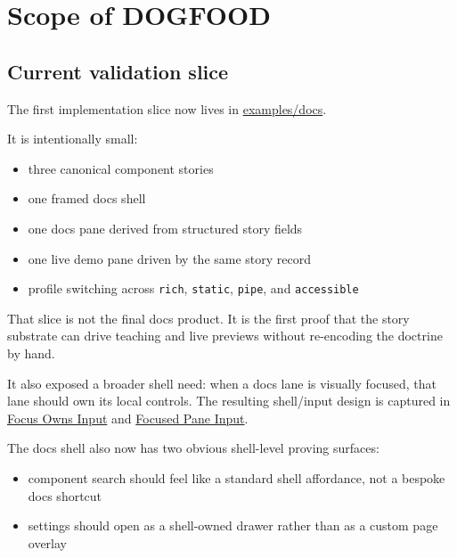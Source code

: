 \section{Scope of DOGFOOD}\label{record-042-scope-of-dogfood}

\subsection{Current validation slice}\label{record-042-current-validation-slice}

The first implementation slice now lives in \href{https://github.com/flyingrobots/bijou/blob/cbd70612140e7a450d764b3c7be1c6af878b99bc/examples/docs/README.md}{examples/docs}.

It is intentionally small:

\begin{itemize}
\tightlist
\item
  three canonical component stories
\item
  one framed docs shell
\item
  one docs pane derived from structured story fields
\item
  one live demo pane driven by the same story record
\item
  profile switching across \texttt{r\allowbreak{}i\allowbreak{}c\allowbreak{}h}, \texttt{s\allowbreak{}t\allowbreak{}a\allowbreak{}t\allowbreak{}i\allowbreak{}c}, \texttt{p\allowbreak{}i\allowbreak{}p\allowbreak{}e}, and \texttt{a\allowbreak{}c\allowbreak{}c\allowbreak{}e\allowbreak{}s\allowbreak{}s\allowbreak{}i\allowbreak{}b\allowbreak{}l\allowbreak{}e}
\end{itemize}

That slice is not the final docs product. It is the first proof that the story substrate can drive teaching and live previews without re-encoding the doctrine by hand.

It also exposed a broader shell need: when a docs lane is visually focused, that lane should own its local controls. The resulting shell/input design is captured in \href{https://github.com/flyingrobots/bijou/blob/cbd70612140e7a450d764b3c7be1c6af878b99bc/docs/strategy/focus-owns-input.md}{Focus Owns Input} and \href{https://github.com/flyingrobots/bijou/blob/cbd70612140e7a450d764b3c7be1c6af878b99bc/docs/specs/focused-pane-input.spec.json}{Focused Pane Input}.

The docs shell also now has two obvious shell-level proving surfaces:

\begin{itemize}
\tightlist
\item
  component search should feel like a standard shell affordance, not a bespoke docs shortcut
\item
  settings should open as a shell-owned drawer rather than as a custom page overlay
\end{itemize}


